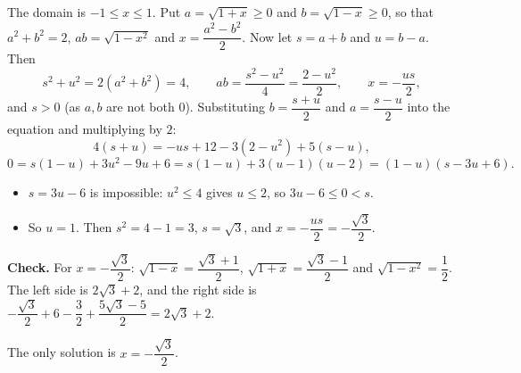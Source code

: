 The domain is $-1\le x\le1$. Put $a=\sqrt{1+x}\ge0$ and $b=\sqrt{1-x}\ge0$, so that $a^2+b^2=2$, $ab=\sqrt{1-x^2}$ and $x=\dfrac{a^2-b^2}{2}$. Now let $s=a+b$ and $u=b-a$. Then
\[s^2+u^2=2\left(a^2+b^2\right)=4,\qquad ab=\dfrac{s^2-u^2}{4}=\dfrac{2-u^2}{2},\qquad x=-\dfrac{us}{2},\]
and $s>0$ (as $a,b$ are not both $0$). Substituting $b=\dfrac{s+u}2$ and $a=\dfrac{s-u}2$ into the equation and multiplying by $2$:
\[4(s+u)=-us+12-3\left(2-u^2\right)+5(s-u),\]
\[0=s(1-u)+3u^2-9u+6=s(1-u)+3(u-1)(u-2)=(1-u)(s-3u+6).\]
\begin{itemize}
\item $s=3u-6$ is impossible: $u^2\le4$ gives $u\le2$, so $3u-6\le0<s$.
\item So $u=1$. Then $s^2=4-1=3$, $s=\sqrt3$, and $x=-\dfrac{us}{2}=-\dfrac{\sqrt3}{2}$.
\end{itemize}
\textbf{Check.} For $x=-\dfrac{\sqrt3}{2}$: $\sqrt{1-x}=\dfrac{\sqrt3+1}{2}$, $\sqrt{1+x}=\dfrac{\sqrt3-1}{2}$ and $\sqrt{1-x^2}=\dfrac12$. The left side is $2\sqrt3+2$, and the right side is $-\dfrac{\sqrt3}2+6-\dfrac32+\dfrac{5\sqrt3-5}{2}=2\sqrt3+2$.

The only solution is $\boxed{x=-\dfrac{\sqrt3}{2}}$.
